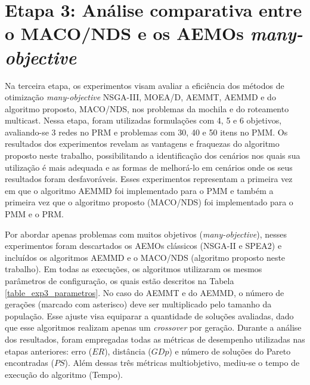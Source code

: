 \section{Etapa 3: Análise comparativa entre o MACO/NDS e os AEMOs \textit{many-objective}}
\label{section_experimentos_etapa3}

Na terceira etapa, os experimentos visam avaliar a eficiência dos métodos de otimização \textit{many-objective} NSGA-III, MOEA/D, AEMMT, AEMMD e do algoritmo proposto, MACO/NDS, nos problemas da mochila e do roteamento multicast. Nessa etapa, foram utilizadas formulações com 4, 5 e 6 objetivos, avaliando-se 3 redes no PRM e problemas com 30, 40 e 50 itens no PMM. Os resultados dos experimentos revelam as vantagens e fraquezas do algoritmo proposto neste trabalho, possibilitando a identificação dos cenários nos quais sua utilização é mais adequada e as formas de melhorá-lo em cenários onde os seus resultados foram desfavoráveis. Esses experimentos representam a primeira vez em que o algoritmo AEMMD foi implementado para o PMM e também a primeira vez que o algoritmo proposto (MACO/NDS) foi implementado para o PMM e o PRM.

Por abordar apenas problemas com muitos objetivos (\textit{many-objective}), nesses experimentos foram descartados os AEMOs clássicos (NSGA-II e SPEA2) e incluídos os algoritmos AEMMD e o MACO/NDS (algoritmo proposto neste trabalho). Em todas as execuções, os algoritmos utilizaram os mesmos parâmetros de configuração, os quais estão descritos na Tabela \ref{table_exp3_parametros}. No caso do AEMMT e do AEMMD, o número de gerações (marcado com asterisco) deve ser multiplicado pelo tamanho da população. Esse ajuste visa equiparar a quantidade de soluções avaliadas, dado que esse algoritmos realizam apenas um \textit{crossover} por geração. Durante a análise dos resultados, foram empregadas todas as métricas de desempenho utilizadas nas etapas anteriores: erro ($ER$),  distância ($GDp$) e número de soluções do Pareto encontradas ($PS$). Além dessas três métricas multiobjetivo, mediu-se o tempo de execução do algoritmo (Tempo).

